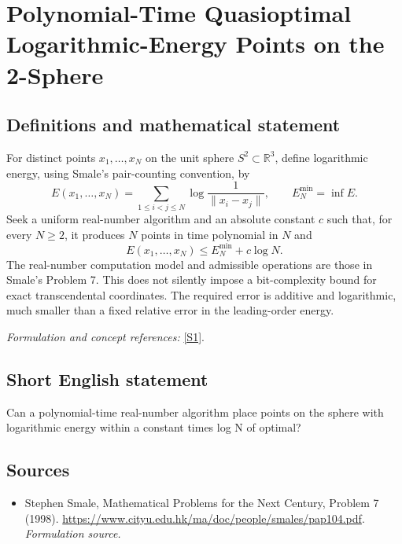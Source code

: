 \documentclass[11pt]{article}
\begin{document}
\section*{\texorpdfstring{Polynomial-Time Quasioptimal Logarithmic-Energy Points on the 2-Sphere}{Polynomial-Time Quasioptimal Logarithmic-Energy Points on the 2-Sphere}}\label{30006958}
\subsection{Definitions and mathematical statement}
For distinct points $x_1,\ldots,x_N$ on the unit sphere $S^2\subset{\mathbb{R}}^3$, define logarithmic energy, using Smale's pair-counting convention, by
\[
 E(x_1,\ldots,x_N)=\sum_{1\le i<j\le N}
 \log\frac1{\|x_i-x_j\|},\qquad E_N^{\min}=\inf E.
\]
Seek a uniform real-number algorithm and an absolute constant $c$ such that, for every $N\ge2$, it produces $N$ points in time polynomial in $N$ and
\[
 E(x_1,\ldots,x_N)\le E_N^{\min}+c\log N.
\]
The real-number computation model and admissible operations are those in Smale's Problem 7. This does not silently impose a bit-complexity bound for exact transcendental coordinates. The required error is additive and logarithmic, much smaller than a fixed relative error in the leading-order energy.
\par\smallskip\textit{Formulation and concept references:} \href{https://www.cityu.edu.hk/ma/doc/people/smales/pap104.pdf}{[S1]}.

\subsection{Short English statement}
Can a polynomial-time real-number algorithm place points on the sphere with logarithmic energy within a constant times log N of optimal?
\subsection{Sources}
\begin{itemize}
\item[S1]Stephen Smale, Mathematical Problems for the Next Century, Problem 7 (1998).
\url{https://www.cityu.edu.hk/ma/doc/people/smales/pap104.pdf}.
\textit{Formulation source.}
\end{itemize}
\end{document}
